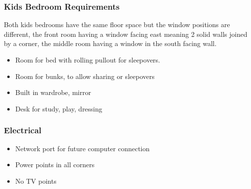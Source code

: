 \subsubsection{Kids Bedroom Requirements}
Both kids bedrooms have the same floor space but the window positions are different, the front room having a window facing east meaning 2 solid walls joined by a corner, the middle room having a window in the south facing wall.

\begin{itemize}
\item Room for bed with rolling pullout for sleepovers. 
\item Room for bunks, to allow sharing or sleepovers
\item Built in wardrobe, mirror
\item Desk for study, play, dressing
\end{itemize}

\subsubsection{Electrical}
\begin{itemize}
\item Network port for future computer connection
\item Power points in all corners
\item No TV points
\end{itemize}

